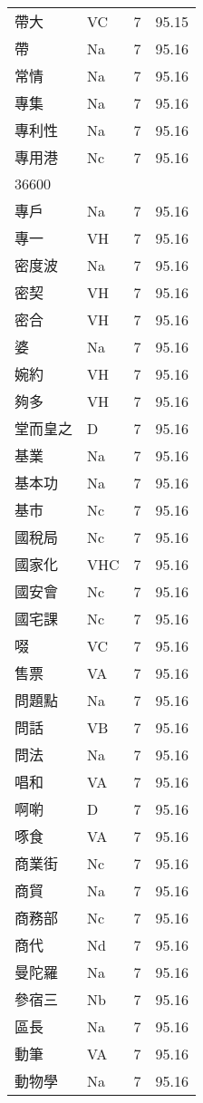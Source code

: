 \documentclass[twocolumn]{book}
\begin{document}
\begin{supertabular}{llrr}
帶大 & VC & 7 &  95.15\\
帶 & Na & 7 &  95.16\\
常情 & Na & 7 &  95.16\\
專集 & Na & 7 &  95.16\\
專利性 & Na & 7 &  95.16\\
專用港 & Nc & 7 &  95.16\\
36600\\
專戶 & Na & 7 &  95.16\\
專一 & VH & 7 &  95.16\\
密度波 & Na & 7 &  95.16\\
密契 & VH & 7 &  95.16\\
密合 & VH & 7 &  95.16\\
婆 & Na & 7 &  95.16\\
婉約 & VH & 7 &  95.16\\
夠多 & VH & 7 &  95.16\\
堂而皇之 & D & 7 &  95.16\\
基業 & Na & 7 &  95.16\\
基本功 & Na & 7 &  95.16\\
基市 & Nc & 7 &  95.16\\
國稅局 & Nc & 7 &  95.16\\
國家化 & VHC & 7 &  95.16\\
國安會 & Nc & 7 &  95.16\\
國宅課 & Nc & 7 &  95.16\\
啜 & VC & 7 &  95.16\\
售票 & VA & 7 &  95.16\\
問題點 & Na & 7 &  95.16\\
問話 & VB & 7 &  95.16\\
問法 & Na & 7 &  95.16\\
唱和 & VA & 7 &  95.16\\
啊喲 & D & 7 &  95.16\\
啄食 & VA & 7 &  95.16\\
商業街 & Nc & 7 &  95.16\\
商貿 & Na & 7 &  95.16\\
商務部 & Nc & 7 &  95.16\\
商代 & Nd & 7 &  95.16\\
曼陀羅 & Na & 7 &  95.16\\
參宿三 & Nb & 7 &  95.16\\
區長 & Na & 7 &  95.16\\
動筆 & VA & 7 &  95.16\\
動物學 & Na & 7 &  95.16\\

\end{supertabular}
\end{document}
